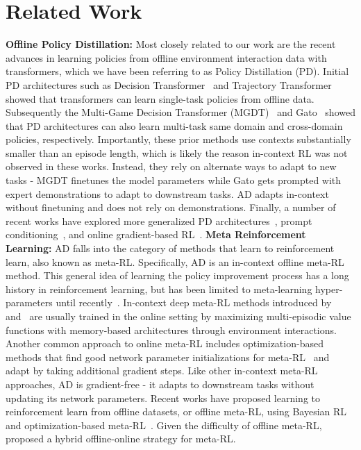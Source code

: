 \documentclass{article}
\theoremstyle{thm}
\newcommand{\name}{AD }
\begin{document}
\section{Related Work}
\label{sec:related-work}
{\bf Offline Policy Distillation:} Most closely related to our work are the recent advances in learning policies from offline environment interaction data with transformers, which we have been referring to as Policy Distillation (PD). Initial PD architectures such as Decision Transformer~\citep{chen2021dt} and Trajectory Transformer~\citep{janner2021tto} showed that transformers can learn single-task policies from offline data. Subsequently the Multi-Game Decision Transformer (MGDT)~\citep{lee2022mgdt} and Gato~\citep{reed2022gato} showed that PD architectures can also learn multi-task same domain and cross-domain policies, respectively. Importantly, these prior methods use contexts substantially smaller than an episode length, which is likely the reason in-context RL was not observed in these works. Instead, they rely on alternate ways to adapt to new tasks - MGDT finetunes the model parameters while Gato gets prompted with expert demonstrations to adapt to downstream tasks. \name adapts in-context without finetuning and does not rely on demonstrations.
Finally, a number of recent works have explored more generalized PD architectures~\citep{furuta2022gdt}, prompt conditioning~\citep{xu2022pdt}, and online gradient-based RL~\citep{zheng2022odt}.
{\bf Meta Reinforcement Learning:} \name falls into the category of methods that learn to reinforcement learn, also known as meta-RL. Specifically, \name is an in-context offline meta-RL method. This general idea of learning the policy improvement process has a long history in reinforcement learning, but has been limited to meta-learning hyper-parameters until recently~\citep{ishii2002control}. In-context deep meta-RL methods introduced by~\citet{wang2016metarl} and~\citet{duan2016rl2} are usually trained in the online setting by maximizing multi-episodic value functions with memory-based architectures through environment interactions. Another common approach to online meta-RL includes optimization-based methods that find good network parameter initializations for meta-RL~\citep{hochreiter2001learning, finn17maml, nichol2018reptile} and adapt by taking additional gradient steps. Like other in-context meta-RL approaches, \name is gradient-free - it adapts to downstream tasks without updating its network parameters. Recent works have proposed learning to reinforcement learn from offline datasets, or offline meta-RL, using Bayesian RL~\citep{dorfman21omrl} and optimization-based meta-RL~\citep{mitchell21macaw}. Given the difficulty of offline meta-RL, \citet{pong2022offline} proposed a hybrid offline-online strategy for meta-RL.
\end{document}
